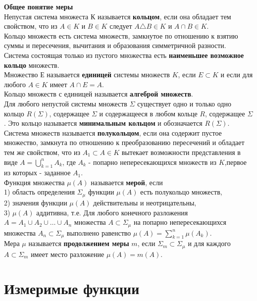 \documentclass{article}
\begin{document}
	\textbf{Общее понятие меры}\\
	Непустая система множеста $К$ иазывается \textbf{кольцом}, если она обладает тем свойством, что из $A\in K$ и $B \in K$  следует $A \triangle B \in K$ и $A \cap B \in K$. \\
	Кольцо множеств есть система множеств, замкнутое по отношению к взятию суммы и пересечения, вычитания и образования симметричной разности. \\
	Система состоящая только из пустого множества есть \textbf{наименьшее возможное кольцо} множеств.\\
	Множество Е называется \textbf{единицей} системы множеств $K$, если $E\subset K$ и если для любого $A\in K$ имеет $A\cap E = A$.\\
	Кольцо множеств с единицей называется \textbf{алгеброй множеств}.\\
	Для любого непустой системы множеств $\Sigma$ существует одно и только одно кольцо $R(\Sigma)$, содержащее $\Sigma$ и содержащееся в любом кольце $R$, содержащее $\Sigma$. Это кольцо называется \textbf{минимальным кольцом} и обозначается $R(\Sigma)$.\\
	Система множеств называется \textbf{полукольцом}, если она содержит пустое множество, замкнута по отношению к преобразованию пересечений и обладает тем же свойством, что из ${A}_{1}\subset A\in K$ вытекает возможности представления в виде $A=\bigcup_{k=1}^{n} {A}_{k}$, где ${A}_{k}$ - попарно непересекающихся множеств из $K$,первое из которых - заданное ${A}_{1}$.\\
	Функция множества $\mu (A)$ называется \textbf{мерой},
	если\\
	1) область определения $\Sigma_{\mu}$ функции $\mu (A)$  есть полукольцо множеств,\\
	2) значения функции $\mu (A)$ действительны и неотрицательны,\\
	3) $\mu (A)$ аддитивна, т.е. Для любого конечного разложения $A=A_{1} \cup A_{2} \cup \ldots \cup A_{n}$ множества $A\subset \Sigma_{\mu}$  на попарно непересекающихся множества $A_{n} \subset   \Sigma_{\mu}$  выполнено равенство $\mu(A)=\sum_{k=1}^{n} \mu\left(A_{k}\right)$.\\
	Мера $\mu$ называется \textbf{продолжением меры} $m$,  если $\Sigma_{m} \subset \Sigma_{\mu}$ и для каждого $A \subset \Sigma_{m}$ имеет место разложение $\mu (A)=m(A)$.\\
\section{Измеримые функции}
\end{document}
